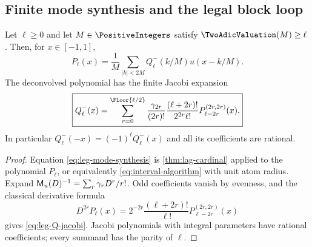 \subsection{Finite mode synthesis and the legal block loop}

\begin{theorem}
\label{thm:leg-mode-synthesis}
Let $\ell\ge0$ and let $M\in\PositiveIntegers$ satisfy
$\TwoAdicValuation(M)\ge\ell$.  Then, for $x\in[-1,1]$,
\begin{equation}
 \boxed{
 P_\ell(x)=\frac1M\sum_{|k|<2M}
 Q_\ell^-(k/M)u(x-k/M).}
 \label{eq:leg-mode-synthesis}
\end{equation}
The deconvolved polynomial has the finite Jacobi expansion
\begin{equation}
 \boxed{
 Q_\ell^-(x)=
 \sum_{r=0}^{\Floor{\ell/2}}
 \frac{\gamma_{2r}}{(2r)!}
 \frac{(\ell+2r)!}{2^{2r}\ell!}
 P_{\ell-2r}^{(2r,2r)}(x).}
 \label{eq:leg-Q-jacobi}
\end{equation}
In particular $Q_\ell^-(-x)=(-1)^\ell Q_\ell^-(x)$ and all its
coefficients are rational.
\end{theorem}

\begin{proof}
Equation \eqref{eq:leg-mode-synthesis} is
\cref{thm:lag-cardinal} applied to the polynomial $P_\ell$, or equivalently
\eqref{eq:interval-algorithm} with unit atom radius.  Expand
$\mathsf M_u(D)^{-1}=\sum_r\gamma_rD^r/r!$.  Odd coefficients vanish by evenness,
and the classical derivative formula
\[
 D^{2r}P_\ell(x)=
 2^{-2r}\frac{(\ell+2r)!}{\ell!}
 P_{\ell-2r}^{(2r,2r)}(x)
\]
gives \eqref{eq:leg-Q-jacobi}.  Jacobi polynomials with integral parameters
have rational coefficients; every summand has the parity of $\ell$.
\end{proof}

